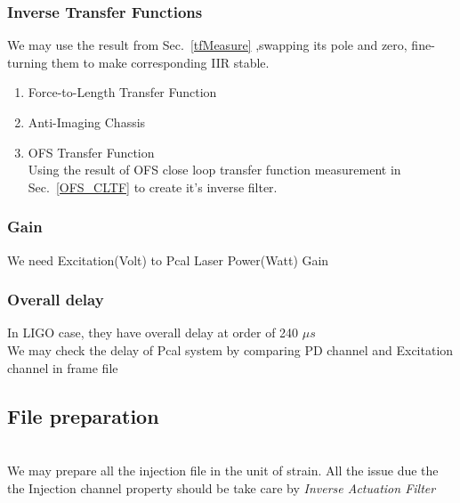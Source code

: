     \subsubsection{Inverse Transfer Functions}
        We may use the result from Sec.~\ref{tfMeasure} ,swapping its pole and zero, fine-turning them to make corresponding IIR stable.
        \begin{enumerate}
            \item Force-to-Length Transfer Function
            \item Anti-Imaging Chassis   
            \item OFS Transfer Function \\
            Using the result of OFS close loop transfer function measurement in Sec.~\ref{OFS_CLTF} to create it's inverse filter. 
        \end{enumerate}


    \subsubsection{Gain}
    We need Excitation(Volt) to Pcal Laser Power(Watt) Gain
    
    \subsubsection{Overall delay}
In LIGO case, they have overall delay at order of 240 $\mu s$ \cite{ligo:inj}\\
We may check the delay of Pcal system by comparing PD channel and Excitation channel in frame file


\subsection{File preparation}
\\
We may prepare all the injection file in the unit of strain. All the issue due the the Injection channel property should be take care by \emph{Inverse Actuation Filter}
